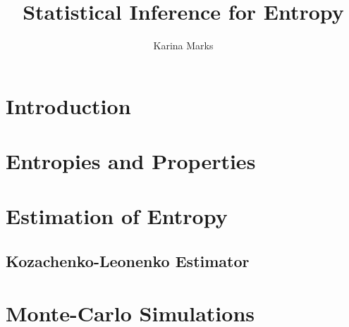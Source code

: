 \documentclass{article}
\title{Statistical Inference for Entropy}
\author{Karina Marks}
\begin{document}
\maketitle
\section{Introduction}


\section{Entropies and Properties}


\section{Estimation of Entropy}

\subsection{Kozachenko-Leonenko Estimator}


\section{Monte-Carlo Simulations}
\end{document}
